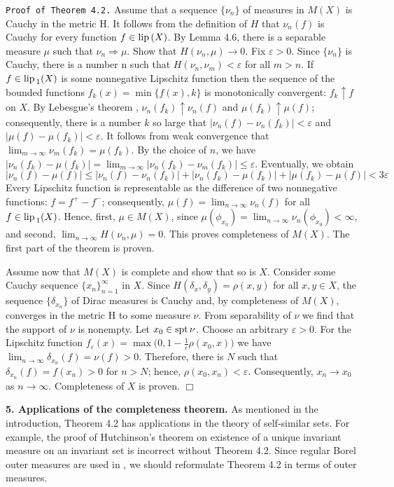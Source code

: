 \documentclass[11pt,a4paper]{article}
\begin{document}
{\tt Proof of Theorem 4.2.} %
Assume that a sequence $\{\nu_n\}$ of measures in $M(X)$
is Cauchy in the metric H.
It follows from the definition of $H$
that $\nu_n(f)$ is Cauchy for every function $f\in{\rm lip\,}(X)$.
By Lemma 4.6, there is a separable measure $\mu$
such that $\nu_n\Rightarrow\mu$.
Show that $H(\nu_n,\mu)\to 0$. Fix $\varepsilon>0$.
Since $\{\nu_n\}$ is Cauchy, there is a number n such
that $H(\nu_n,\nu_m)<\varepsilon$ for all $m>n$.
If $f\in{\rm lip\,}_1(X)$ is some nonnegative Lipschitz function
then the sequence of the bounded functions $f_k(x)=\min\{f(x),k\}$
is monotonically convergent: $f_k\uparrow f$ on $X$.
By Lebesgue's theorem \cite[Chapter 1, \S 12, (12.6), p. 48]{Sax},
$\nu_n(f_k)\uparrow\nu_n(f)$ and $\mu(f_k)\uparrow\mu(f)$;
consequently, there is a number $k$ so large that
$|\nu_n(f)-\nu_n(f_k)|<\varepsilon$ and $|\mu(f)-\mu(f_k)|<\varepsilon$.
It follows from weak convergence that $\lim_{m\to\infty}\nu_m(f_k)=\mu(f_k)$.
By the choice of $n$, we have
$|\nu_n(f_k)-\mu(f_k)|=\lim_{m\to\infty}|\nu_n(f_k)-\nu_m(f_k)|\le\varepsilon$.
Eventually, we obtain
$$|\nu_n(f)-\mu(f)|\le|\nu_n(f)-\nu_n(f_k)|+|\nu_n(f_k)-\mu(f_k)|+|\mu(f_k)-\mu(f)|<3\varepsilon$$
Every Lipschitz function is representable as the difference of two nonnegative functions: $f=f^{+}-f^{-}$;
consequently, $\mu(f)=\lim_{n\to\infty}\nu_n(f)$ for all ${f\in{\rm lip\,}_1(X)}$.
Hence, first, $\mu\in M(X)$, since
$\mu(\phi_{x_0})=\lim_{n\to\infty}\nu_n(\phi_{x_0})<\infty$,
and second, $\lim_{n\to\infty}H(\nu_n,\mu)=0$.
This proves completeness of $M(X)$.
The first part of the theorem is proven.

Assume now that $M(X)$ is complete and show that so is $X$.
Consider some Cauchy sequence
$\{x_n\}_{n=1}^{\infty}$ in $X$.
Since $H(\delta_x, \delta_y)=\rho(x,y)$ for all ${x,y\in X}$,
the sequence $\{\delta_{x_n}\}$ of Dirac measures is Cauchy and,
by completeness of $M(X)$, converges in the metric H to some measure $\nu$.
From separability of $\nu$ we find that the support of $\nu$ is nonempty.
Let $x_0\in{\rm spt\,}\nu$.
Choose an arbitrary $\varepsilon>0$. For the Lipschitz function
$f_{\varepsilon}(x)=\max\bigl(0, 1-\frac{1}{\varepsilon}\rho(x_0,x) \bigr)$
we have $\lim_{n\to\infty}\delta_{x_n}(f)=\nu(f)>0$.
Therefore, there is $N$ such that
$\delta_{x_n}(f)=f(x_n)>0$ for $n>N$; hence,
$\rho(x_0,x_n)<\varepsilon$. Consequently, $x_n\to x_0$ as $n\to\infty$.
Completeness of $X$ is proven.
\hbox{$\Box$}


\vspace{2em}
{\bf 5. Applications of the completeness theorem.} %
As mentioned in the introduction,
Theorem 4.2 has applications in the theory of self-similar sets.
For example, the proof of Hutchinson's theorem \cite[4.4(1)]{Ht}
on existence of a unique invariant measure on an invariant set is
incorrect without Theorem 4.2.
Since regular Borel outer measures are used in \cite[4.4(1)]{Ht},
we should reformulate Theorem 4.2 in terms of outer measures.
\end{document}
